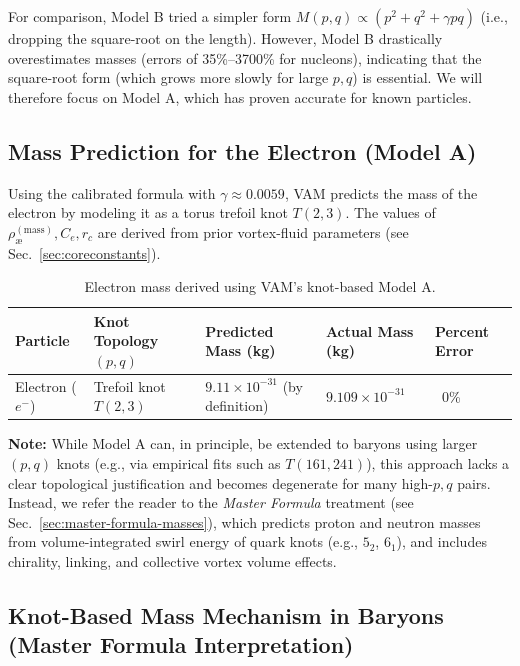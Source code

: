 \documentclass[a4paper,12pt]{article}
\begin{document}
For comparison, Model B tried a simpler form $M(p,q) \propto (p^2 + q^2 + \gamma p q)$ (i.e., dropping the square-root on the length). However, Model B drastically overestimates masses (errors of 35\%--3700\% for nucleons), indicating that the square-root form (which grows more slowly for large $p,q$) is essential. We will therefore focus on Model A, which has proven accurate for known particles.
\subsection{Mass Prediction for the Electron (Model A)}

Using the calibrated formula with $\gamma\approx0.0059$, VAM predicts the mass of the electron by modeling it as a torus trefoil knot $T(2,3)$. The values of $\rho_{\text{\ae}}^{(\text{mass})}, C_e, r_c$ are derived from prior vortex-fluid parameters (see Sec.~\ref{sec:coreconstants}).

\begin{table}[H]
    \centering
    \footnotesize
    \begin{tabular}{lllll}
        \toprule
        \textbf{Particle} & \textbf{Knot Topology $(p,q)$} & \textbf{Predicted Mass (kg)} & \textbf{Actual Mass (kg)} & \textbf{Percent Error} \\
        \midrule
        Electron ($e^-$) & Trefoil knot $T(2,3)$ & $9.11\times10^{-31}$ (by definition) & $9.109\times10^{-31}$ & ~0\% \\
        \bottomrule
    \end{tabular}
    \caption{Electron mass derived using VAM's knot-based Model A.}
    \label{tab:ModelA_Electron}
\end{table}

\noindent
\textbf{Note:} While Model A can, in principle, be extended to baryons using larger $(p,q)$ knots (e.g., via empirical fits such as $T(161,241)$), this approach lacks a clear topological justification and becomes degenerate for many high-$p,q$ pairs. Instead, we refer the reader to the \textit{Master Formula} treatment (see Sec.~\ref{sec:master-formula-masses}), which predicts proton and neutron masses from volume-integrated swirl energy of quark knots (e.g., $5_2$, $6_1$), and includes chirality, linking, and collective vortex volume effects.
\subsection{Knot-Based Mass Mechanism in Baryons (Master Formula Interpretation)}
\end{document}
